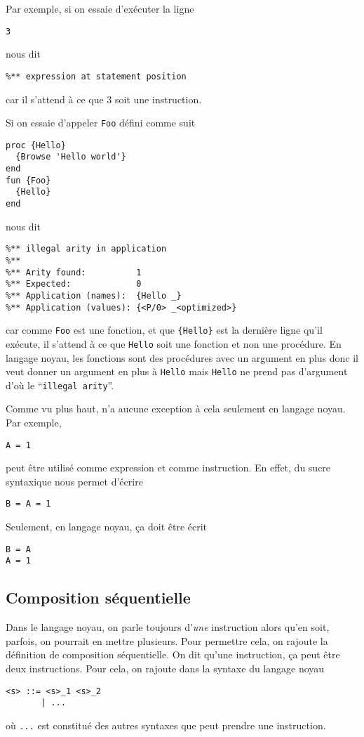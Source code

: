 Par exemple, si on essaie d'exécuter la ligne
\begin{lstlisting}
3
\end{lstlisting}
\oz{} nous dit
\begin{lstlisting}
%** expression at statement position
\end{lstlisting}
car il s'attend à ce que 3 soit une instruction.

Si on essaie d'appeler \lstinline{Foo} défini comme suit
\begin{lstlisting}
proc {Hello}
  {Browse 'Hello world'}
end
fun {Foo}
  {Hello}
end
\end{lstlisting}
\oz{} nous dit
\begin{lstlisting}
%** illegal arity in application
%**
%** Arity found:          1
%** Expected:             0
%** Application (names):  {Hello _}
%** Application (values): {<P/0> _<optimized>}
\end{lstlisting}
car comme \lstinline|Foo| est une fonction,
et que \lstinline|{Hello}| est la dernière ligne qu'il exécute,
il s'attend à ce que \lstinline|Hello| soit une fonction
et non une procédure.
En langage noyau, les fonctions sont des procédures avec un argument
en plus donc il veut donner un argument en plus à \lstinline|Hello|
mais \lstinline{Hello} ne prend pas d'argument d'où le
``\lstinline{illegal arity}''.

Comme vu plus haut,
\oz{} n'a aucune exception à cela seulement en langage noyau.
Par exemple,
\begin{lstlisting}
A = 1
\end{lstlisting}
peut être utilisé comme expression et comme instruction.
En effet, du sucre syntaxique nous permet d'écrire
\begin{lstlisting}
B = A = 1
\end{lstlisting}
Seulement, en langage noyau, ça doit être écrit
\begin{lstlisting}
B = A
A = 1
\end{lstlisting}

\subsection{Composition séquentielle}
Dans le langage noyau, on parle toujours d'\emph{une} instruction
alors qu'en soit, parfois, on pourrait en mettre plusieurs.
Pour permettre cela, on rajoute la définition de composition séquentielle.
On dit qu'une instruction, ça peut être deux instructions.
Pour cela, on rajoute dans la syntaxe du langage noyau
\begin{lstlisting}
<s> ::= <s>_1 <s>_2
       | ...
\end{lstlisting}
où \lstinline|...| est constitué des autres syntaxes que peut prendre
une instruction.

